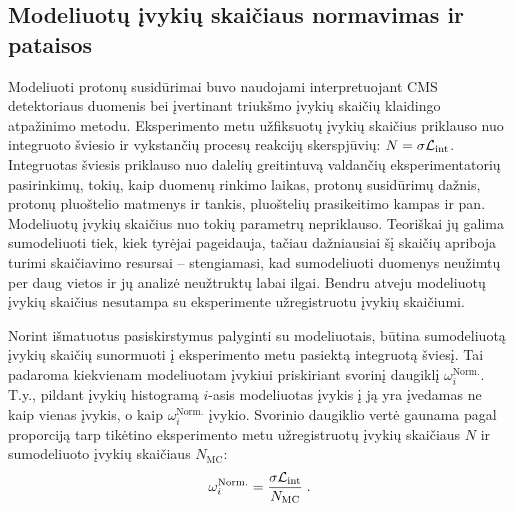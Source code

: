 \documentclass[a4paper, 12pt, oneside]{article}
\newcommand{\Lumi}{{\cal L}_\mathrm{int}}
\newlength\q
\begin{document}
\subsection{Modeliuotų įvykių skaičiaus normavimas ir pataisos}
Modeliuoti protonų susidūrimai buvo naudojami interpretuojant CMS detektoriaus duomenis bei įvertinant triukšmo įvykių
skaičių klaidingo atpažinimo metodu.
Eksperimento metu užfiksuotų įvykių skaičius priklauso nuo integruoto šviesio ir vykstančių procesų reakcijų skerspjūvių:
$N = \sigma\Lumi$.
Integruotas šviesis priklauso nuo dalelių greitintuvą valdančių eksperimentatorių pasirinkimų, tokių, kaip duomenų rinkimo laikas,
protonų susidūrimų dažnis, protonų pluoštelio matmenys ir tankis, pluoštelių prasikeitimo kampas ir pan.
Modeliuotų įvykių skaičius nuo tokių parametrų nepriklauso.
Teoriškai jų galima sumodeliuoti tiek, kiek tyrėjai pageidauja, tačiau dažniausiai šį skaičių apriboja turimi skaičiavimo
resursai -- stengiamasi, kad sumodeliuoti duomenys neužimtų per daug vietos ir jų analizė neužtruktų labai ilgai.
Bendru atveju modeliuotų įvykių skaičius nesutampa su eksperimente užregistruotu įvykių skaičiumi.

Norint išmatuotus pasiskirstymus palyginti su modeliuotais, būtina sumodeliuotą įvykių skaičių sunormuoti į eksperimento
metu pasiektą integruotą šviesį.
Tai padaroma kiekvienam modeliuotam įvykiui priskiriant svorinį daugiklį $\omega_{i}^{\mathrm{Norm.}}$.
T.y., pildant įvykių histogramą $i$-asis modeliuotas įvykis į ją yra įvedamas ne kaip vienas įvykis, o kaip
$\omega_{i}^{\mathrm{Norm.}}$ įvykio.
Svorinio daugiklio vertė gaunama pagal proporciją tarp tikėtino eksperimento metu užregistruotų įvykių skaičiaus $N$ ir
sumodeliuoto įvykių skaičiaus $N_{\mathrm{MC}}$:
\begin{equation}
	\label{eq:LOweight}
	\omega_{i}^{\mathrm{Norm.}} = \frac{ \sigma\Lumi }{ N_{\mathrm{MC}} } \; .
\end{equation}
\end{document}
